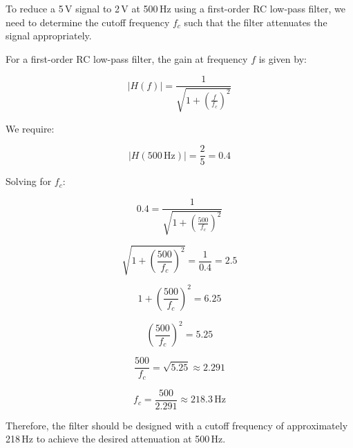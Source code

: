 \documentclass{article}
\begin{document}
To reduce a 5\,V signal to 2\,V at 500\,Hz using a first-order RC low-pass filter, we need to determine the cutoff frequency \( f_c \) such that the filter attenuates the signal appropriately.

For a first-order RC low-pass filter, the gain at frequency \( f \) is given by:

\[
|H(f)| = \frac{1}{\sqrt{1 + \left( \frac{f}{f_c} \right)^2 }}
\]

We require:

\[
|H(500\,\text{Hz})| = \frac{2}{5} = 0.4
\]

Solving for \( f_c \):

\[
0.4 = \frac{1}{\sqrt{1 + \left( \frac{500}{f_c} \right)^2 }}
\]

\[
\sqrt{1 + \left( \frac{500}{f_c} \right)^2 } = \frac{1}{0.4} = 2.5
\]

\[
1 + \left( \frac{500}{f_c} \right)^2 = 6.25
\]

\[
\left( \frac{500}{f_c} \right)^2 = 5.25
\]

\[
\frac{500}{f_c} = \sqrt{5.25} \approx 2.291
\]

\[
f_c = \frac{500}{2.291} \approx \boxed{218.3\,\text{Hz}}
\]

Therefore, the filter should be designed with a cutoff frequency of approximately 218\,Hz to achieve the desired attenuation at 500\,Hz.
\end{document}
